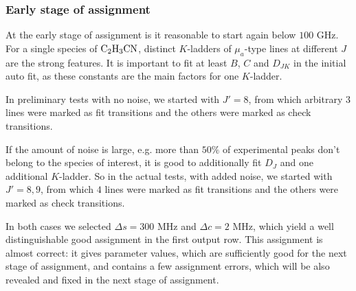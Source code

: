 \documentclass[11pt]{article}
\begin{document}
\subsubsection{Early stage of assignment}

At the early stage of assignment is it reasonable to start again below $100$ GHz. 
For a single species of $\rm C_2H_3CN$, 
distinct $K$-ladders of $\mu_a$-type lines at different $J$ are the strong features. %
It is important to fit at least $B$, $C$ and $D_{JK}$ in the initial auto fit, as these constants are the main factors for one $K$-ladder. 

In preliminary tests with no noise, we started with $J' = 8$, from which arbitrary $3$ lines were marked as fit transitions and the others were marked as check transitions. 

If the amount of noise is large, e.g. more than $50\%$ of  experimental peaks don't belong to the species of interest, it is good to additionally fit $D_J$ and one additional $K$-ladder. So in the actual tests, with added noise, we started with $J' = 8, 9$, from which $4$ lines were marked as fit transitions and the others were marked as check transitions.

In both cases we selected $\Delta s = 300$ MHz and $\Delta c = 2$ MHz, which yield a well distinguishable good assignment in the first output row. This assignment is almost correct: it gives parameter values, which are sufficiently good for the next stage of assignment, and contains a few assignment errors, which will be also revealed and fixed in the next stage of assignment. 


\end{document}
